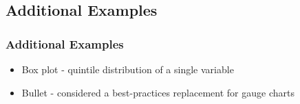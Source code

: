 \documentclass{beamer}
\begin{document}
\subsection{Additional Examples}

\begin{frame}
\frametitle{Additional Examples}
\begin{itemize}
\item Box plot - quintile distribution of a single variable
\item Bullet - considered a best-practices replacement for gauge charts
\end{itemize}
\end{frame}





\end{document}
